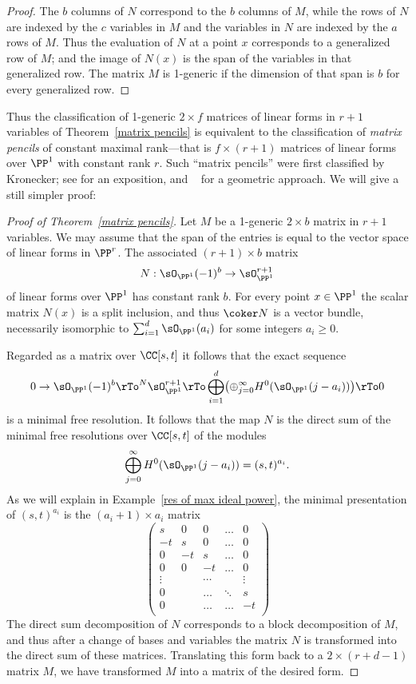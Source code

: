 \begin{proof}
The $b$ columns of $N$ correspond to the $b$ columns of $M$, while the rows of $N$ are indexed
by the $c$ variables in $M$ and the variables in $N$ are indexed by the $a$ rows of $M$. Thus the
evaluation of $N$ at a point $x$ corresponds to a generalized row of $M$; and the image of $N(x)$
is the span of the variables in that generalized row. The matrix $M$ is 1-generic if the dimension
of that span is $b$ for every generalized row.
\end{proof}

Thus the classification of 1-generic $2\times f$ matrices of linear forms in $r+1$ variables of Theorem~\ref{matrix pencils} is equivalent to the classification
of \emph{matrix pencils} of constant maximal rank---that is $f \times (r+1)$ matrices of linear forms over $\PP^{1}$ with constant rank $r$.
Such ``matrix pencils'' were first classified by Kronecker; see 
\cite[Vol. II, Chapter 12]{Gantmacher} for an exposition, and ~\cite{Eisenbud-Harris-Centennial} for a geometric approach.
We will give a still simpler proof:

\begin{proof}[Proof of Theorem~\ref{matrix pencils}]
Let $M$ be a 1-generic $2\times b$ matrix in $r+1$ variables. We may assume that the span of the entries
is equal to the vector space of linear forms in $\PP^{r}$. The associated 
$(r+1)\times b$ matrix
$$
N: \sO_{\PP^{1}}(-1)^{b} \to \sO_{\PP^{1}}^{r+1}
$$
 of linear forms over $\PP^{1}$ has constant rank $b$.
For every point $x\in \PP^{1}$ the scalar matrix $N(x)$ is a split inclusion, and thus
$\coker N$ is a vector bundle, necessarily isomorphic to $\sum_{i =1}^{d}\sO_{\PP^{1}}(a_{i})$ for some
integers $a_{i}\geq 0$. 

Regarded as a matrix over $\CC[s,t]$ it follows that the exact sequence
$$
0\to \sO_{\PP^{1}}(-1)^{b} \rTo^{N} \sO_{\PP^{1}}^{r+1}  \rTo \bigoplus_{i = 1}^{d}\bigl( \oplus_{j=0}^{\infty}H^{0}(\sO_{\PP^{1}}(j-a_{i}))\bigr)\rTo 0
$$
is a minimal free resolution. It follows that the map $N$ is the direct sum of the minimal free resolutions over $\CC[s,t]$
of the modules 
$$
\bigoplus_{j=0}^{\infty}H^{0}(\sO_{\PP^{1}}(j-a_{i})) = (s,t)^{a_{i}}.
$$
As we will explain in Example~\ref{res of max ideal power}, the minimal presentation of $(s,t)^{a_{i}}$ is the $(a_{i}+1)\times a_{i}$ matrix
$$
\begin{pmatrix}
s&0&0&\dots&0\\
-t&s&0&\dots&0\\
0&-t&s&\dots&0\\
0&0&-t&\dots&0\\
\vdots&&\cdots&&\vdots\\
0&&\dots&\ddots&s\\
0&&\dots&\dots&-t\\
\end{pmatrix}
$$
The direct sum decomposition of $N$ corresponds to a block decomposition of $M$,
and thus after a change of bases and variables the matrix $N$ is transformed into the direct sum of these matrices.
Translating this form back to a $2\times (r+d-1)$ matrix $M$, we have transformed $M$ into a matrix of 
the desired form.
\end{proof}


